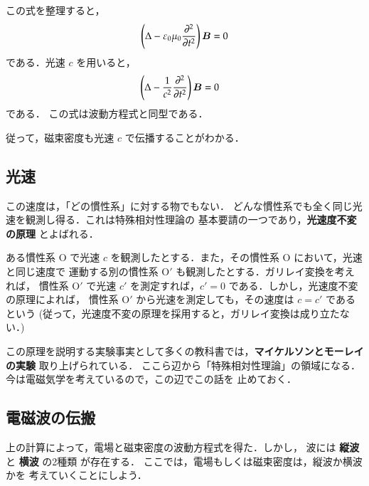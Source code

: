             この式を整理すると，
                \begin{align}
                    \left(\Delta-\varepsilon_{0}\mu_{0}\frac{\partial^{2}}{\partial t^{2}}\right)\boldsymbol{B}=0
                \end{align}
            である．光速 $c$ を用いると，
                                \begin{align}
                                    \left(\Delta-\frac{1}{c^{2}}
                                    \frac{\partial^{2}}{\partial t^{2}}\right)\boldsymbol{B}
                                     &=0
                                     \end{align}
            である．
            この式は波動方程式と同型である．

            従って，磁束密度も光速 $c$ で伝播することがわかる．

    \subsection{光速}
        この速度は，「どの慣性系」に対する物でもない．
        どんな慣性系でも全く同じ光速を観測し得る．これは特殊相対性理論の
        基本要請の一つであり，\textbf{光速度不変の原理} とよばれる．

        ある慣性系 O で光速 $c$ を観測したとする．また，その慣性系 O において，光速と同じ速度で
        運動する別の慣性系 O$'$ も観測したとする．ガリレイ変換を考えれば，
        慣性系 O$'$ で光速 $c'$ を測定すれば，$c'=0$ である．しかし，光速度不変の原理によれば，
        慣性系 O$'$ から光速を測定しても，その速度は $c=c'$ であるという
        (従って，光速度不変の原理を採用すると，ガリレイ変換は成り立たない．)

        この原理を説明する実験事実として多くの教科書では，\textbf{マイケルソンとモーレイの実験} 取り上げられている．
        ここら辺から「特殊相対性理論」の領域になる．今は電磁気学を考えているので，この辺でこの話を
        止めておく．

    \subsection{電磁波の伝搬}
            上の計算によって，電場と磁束密度の波動方程式を得た．しかし，
            波には \textbf{縦波} と \textbf{横波} の2種類
            が存在する．
            ここでは，電場もしくは磁束密度は，縦波か横波かを
            考えていくことにしよう．


